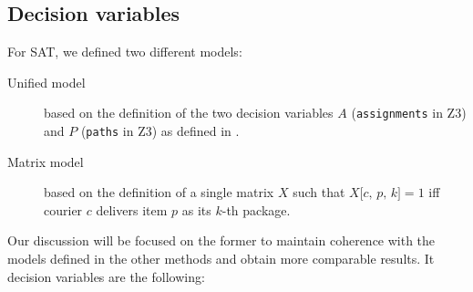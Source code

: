 



\subsection{Decision variables}

For SAT, we defined two different models:
\begin{description}
    \item[Unified model] based on the definition of the two decision variables $A$ (\texttt{assignments} in Z3) and $P$ (\texttt{paths} in Z3) as defined in .

    \item[Matrix model] based on the definition of a single matrix $X$ such that $X\texttt{[$c$, $p$, $k$]} = 1$ iff courier $c$ delivers item $p$ as its $k$-th package.
\end{description}

Our discussion will be focused on the former to maintain coherence with the models defined in the other methods and obtain more comparable results. It decision variables are the following:

